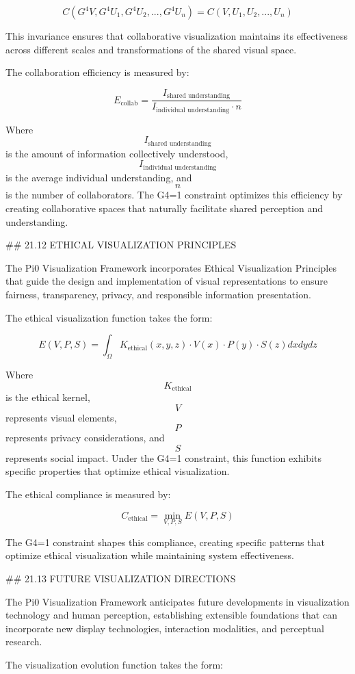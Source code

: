 $$ C(G^4 V, G^4 U_1, G^4 U_2, ..., G^4 U_n) = C(V, U_1, U_2, ..., U_n) $$

This invariance ensures that collaborative visualization maintains its effectiveness across different scales and transformations of the shared visual space.

The collaboration efficiency is measured by:

$$ E_{\text{collab}} = \frac{I_{\text{shared understanding}}}{I_{\text{individual understanding}} \cdot n} $$

Where $$ I_{\text{shared understanding}} $$ is the amount of information collectively understood, $$ I_{\text{individual understanding}} $$ is the average individual understanding, and $$ n $$ is the number of collaborators. The G4=1 constraint optimizes this efficiency by creating collaborative spaces that naturally facilitate shared perception and understanding.

## 21.12 ETHICAL VISUALIZATION PRINCIPLES

The Pi0 Visualization Framework incorporates Ethical Visualization Principles that guide the design and implementation of visual representations to ensure fairness, transparency, privacy, and responsible information presentation.

The ethical visualization function takes the form:

$$ E(V, P, S) = \int_{\Omega} K_{\text{ethical}}(x, y, z) \cdot V(x) \cdot P(y) \cdot S(z) dx dy dz $$

Where $$ K_{\text{ethical}} $$ is the ethical kernel, $$ V $$ represents visual elements, $$ P $$ represents privacy considerations, and $$ S $$ represents social impact. Under the G4=1 constraint, this function exhibits specific properties that optimize ethical visualization.

The ethical compliance is measured by:

$$ C_{\text{ethical}} = \min_{V, P, S} E(V, P, S) $$

The G4=1 constraint shapes this compliance, creating specific patterns that optimize ethical visualization while maintaining system effectiveness.

## 21.13 FUTURE VISUALIZATION DIRECTIONS

The Pi0 Visualization Framework anticipates future developments in visualization technology and human perception, establishing extensible foundations that can incorporate new display technologies, interaction modalities, and perceptual research.

The visualization evolution function takes the form:

